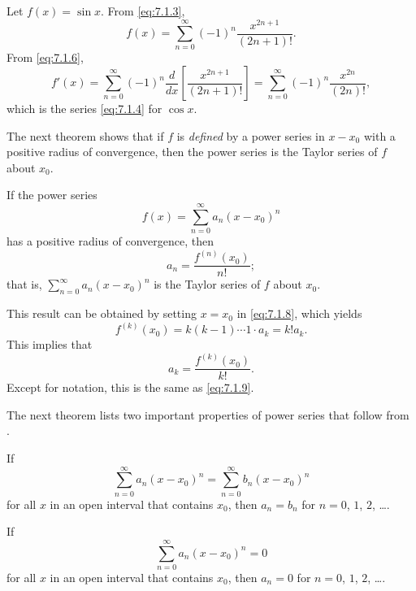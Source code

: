 \begin{example}\label{example:7.1.2}
Let $f(x)=\sin x$. From \eqref{eq:7.1.3},
\[
f(x)=\sum_{n=0}^\infty(-1)^n\frac{x^{2n+1}}{(2n+1)!}.
\]
From  \eqref{eq:7.1.6},
\[
f'(x)=\sum_{n=0}^\infty(-1)^n\frac{d}{dx}\left[\frac{x^{2n+1}}{(2n+1)!}\right]=
\sum_{n=0}^\infty(-1)^n\frac{x^{2n}}{(2n)!},
\]
which is the series  \eqref{eq:7.1.4} for $\cos x$.
\end{example}



The next theorem shows that if $f$ is \emph{\color{blue}defined} by a power
series in $x-x_0$ with a positive radius of convergence, then the power
series is the Taylor
series
of $f$ about $x_0$.

\begin{theorem}\label{thmtype:7.1.5}
If the power series
\[
f(x)=\sum_{n=0}^\infty a_n(x-x_0)^n
\]
has a positive radius of convergence, then
\begin{equation} \label{eq:7.1.9}
a_n=\frac{f^{(n)}(x_0)}{n!};
\end{equation}
that is, $\sum_{n=0}^\infty a_n(x-x_0)^n$ is the Taylor
series of $f$ about $x_0$.
\end{theorem}

This result can be obtained by setting $x=x_0$ in
\eqref{eq:7.1.8}, which yields
\[
f^{(k)}(x_0)=k(k-1)\cdots1\cdot a_k=k!a_k.
\]
This implies that
\[
a_k=\frac{f^{(k)}(x_0)}{k!}.
\]
Except for notation, this is the same as \eqref{eq:7.1.9}.



The next theorem lists two important properties of power series
that follow from .

\begin{theorem}\label{thmtype:7.1.6}
\begin{alist}
\item %
If
\[
\sum_{n=0}^\infty a_n(x-x_0)^n=\sum_{n=0}^\infty b_n(x-x_0)^n
\]
for all $x$  in an open interval that contains $x_0$, then
$a_n=b_n$ for $n=0$, $1$, $2$, \dots.
\item %
If
\[
\sum_{n=0}^\infty a_n(x-x_0)^n=0
\]
 for all $x$ in
an open interval that contains $x_0$, then $a_n=0$ for
$n=0$, $1$, $2$, \dots.
\end{alist}
\end{theorem}

